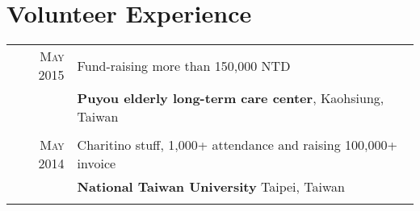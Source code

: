 \documentclass[a4paper,11pt]{article} %
\begin{document}
\section{Volunteer Experience }
\begin{tabular}{r|p{11cm}}

\textsc{May} 2015& Fund-raising more than 150,000 NTD\\
&\normalsize\textbf{Puyou elderly long-term care center}, Kaohsiung, Taiwan\\
&\\

\textsc{May} 2014& Charitino stuff, 1,000+ attendance and raising 100,000+ invoice \\
&\normalsize\textbf{National Taiwan University} Taipei, Taiwan\\
&\\

\end{tabular}


\end{document}
